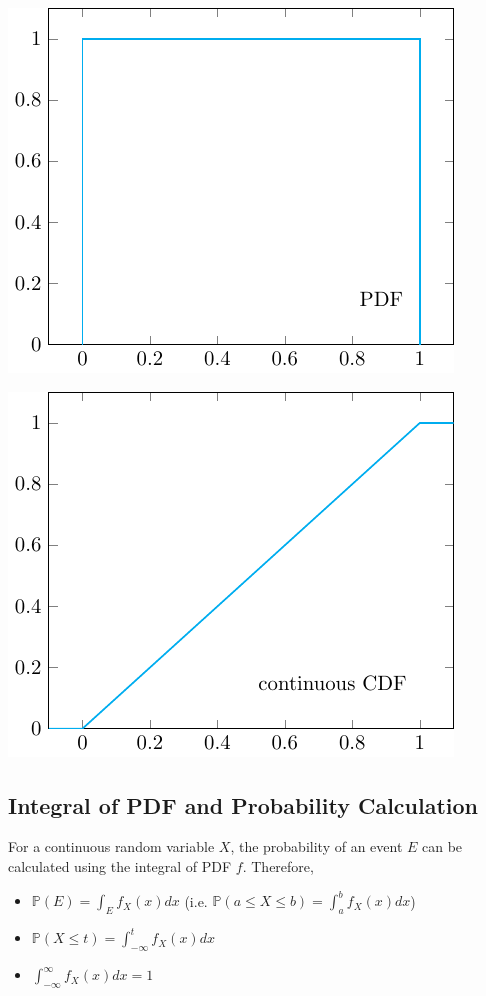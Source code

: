 \begin{minipage}{0.5\textwidth}
    \centering
    \includegraphics{Figures/PDF-visual.pdf}
\end{minipage}
\begin{minipage}{0.5\textwidth}
    \centering
    \includegraphics{Figures/continuous-CDF-visual.pdf}
\end{minipage}

\newpage
\subsection{Integral of PDF and Probability Calculation}
For a continuous random variable \(X\), the probability of an event \(E\) can be calculated using the integral of PDF \(f\). Therefore,
\begin{itemize}
    \item \(\mathbb{P}(E) = \int_E f_X (x)dx\) (i.e. \(\mathbb{P}(a \leq X \leq b) = \int_a^b f_X(x)dx\))
    \item \(\mathbb{P}(X \leq t) = \int_{-\infty}^t f_X (x)dx\) 
    \item \(\int_{-\infty}^{\infty} f_X (x)dx = 1\) 
\end{itemize}

